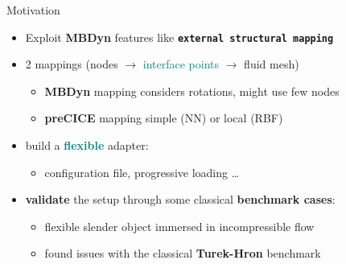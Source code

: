\documentclass[10pt,t]{beamer}
\begin{document}
\begin{frame}{Motivation}

    
    
    \begin{itemize}
        \item Exploit \textcolor{dorange}{\textbf{MBDyn}} features like \textbf{\texttt{external structural mapping}}
        
        \vspace{2mm}
        
        \item 2 mappings (\textcolor{dorange}{nodes} $\to$ \textcolor{teal}{interface points} $\to$ \textcolor{dblue}{fluid mesh})
        \begin{itemize}
        \vspace{1mm}
            \item \textcolor{dorange}{\textbf{MBDyn}} mapping considers rotations, might use few nodes
            \vspace{1mm}
            \item \textcolor{pblue}{\textbf{preCICE}} mapping simple (NN) or local (RBF)
        \end{itemize}

        \vspace{2mm}
        
        \pause
        
        \item build a \textcolor{teal}{\textbf{flexible}} adapter:
        
        \begin{itemize}
            \item configuration file, progressive loading \ldots
        \end{itemize}
        
        \vspace{2mm}
        
        \pause
        
        \item \textcolor{dblue}{\textbf{validate}} the setup through some classical \textbf{benchmark cases}:
        
        \begin{itemize}
            \item flexible slender object immersed in incompressible flow
            \item found issues with the classical \textbf{Turek-Hron} benchmark
        \end{itemize}
        

\end{itemize}
\end{frame}
\end{document}
